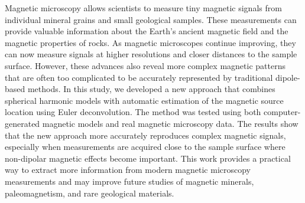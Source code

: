 Magnetic microscopy allows scientists to measure tiny magnetic signals from individual mineral grains and small geological samples. These measurements can provide valuable information about the Earth's ancient magnetic field and the magnetic properties of rocks. As magnetic microscopes continue improving, they can now measure signals at higher resolutions and closer distances to the sample surface. However, these advances also reveal more complex magnetic patterns that are often too complicated to be accurately represented by traditional dipole-based methods. In this study, we developed a new approach that combines spherical harmonic models with automatic estimation of the magnetic source location using Euler deconvolution. The method was tested using both computer-generated magnetic models and real magnetic microscopy data. The results show that the new approach more accurately reproduces complex magnetic signals, especially when measurements are acquired close to the sample surface where non-dipolar magnetic effects become important. This work provides a practical way to extract more information from modern magnetic microscopy measurements and may improve future studies of magnetic minerals, paleomagnetism, and rare geological materials.